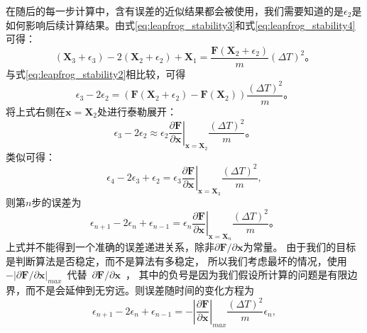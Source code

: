 {在随后的每一步计算中，含有误差的近似结果都会被使用，我们需要知道的是${\epsilon}_2$是如何影响后续计算结果。由式\eqref{eq:leapfrog_stability3}和式\eqref{eq:leapfrog_stability4}可得：
      \begin{equation}
         \label{eq:leapfrog_stabilit6}
         (\mathbf{X}_{3}+{\epsilon}_3)-2(\mathbf{X}_{2}+{\epsilon}_2)+\mathbf{X}_{1} = \frac{\mathbf{F}(\mathbf{X}_2+{\epsilon}_2)}{m} {(\Delta T)^2} \text{。}
      \end{equation}
与式\eqref{eq:leapfrog_stability2}相比较，可得
      \begin{equation}
         \label{eq:leapfrog_stabilit7}
         {\epsilon}_3-2{\epsilon}_2 = \left(\mathbf{F}(\mathbf{X}_2+{\epsilon}_2)  -\mathbf{F}(\mathbf{X}_2) \right)\frac{{(\Delta T)^2}}{m} \text{。}
      \end{equation}
将上式右侧在$\mathbf{x}=\mathbf{X}_2$处进行泰勒展开：
      \begin{equation}
         \label{eq:leapfrog_stabilit8}
         {\epsilon}_3-2{\epsilon}_2 \approx {\epsilon}_2\left. \frac{\partial\mathbf{F}}{\partial\mathbf{x}}\right|_{\mathbf{x}=\mathbf{X}_2} \frac{{(\Delta T)^2}}{m} \text{。}
      \end{equation}
类似可得：
      \begin{equation}
         \label{eq:leapfrog_stabilit9}
         {\epsilon}_4-2{\epsilon}_3+{\epsilon}_2 = {\epsilon}_3\left. \frac{\partial\mathbf{F}}{\partial\mathbf{x}}\right|_{\mathbf{x}=\mathbf{X}_3} \frac{{(\Delta T)^2}}{m},
      \end{equation}
则第$n$步的误差为
      \begin{equation}
         \label{eq:leapfrog_stabilit10}
         {\epsilon}_{n+1}-2{\epsilon}_n+{\epsilon}_{n-1} = {\epsilon}_n \left. \frac{\partial\mathbf{F}}{\partial\mathbf{x}}\right|_{\mathbf{x}=\mathbf{X}_n} \frac{{(\Delta T)^2}}{m} \text{。}
      \end{equation}
上式并不能得到一个准确的误差递进关系，除非${\partial\mathbf{F}}/{\partial\mathbf{x}}$为常量。
由于我们的目标是判断算法是否稳定，而不是算法有多稳定，
所以我们考虑最坏的情况，使用~$-|{\partial\mathbf{F}}/{\partial\mathbf{x}}|_{max}$~代替~${\partial\mathbf{F}}/{\partial\mathbf{x}}$~，
其中的负号是因为我们假设所计算的问题是有限边界，而不是会延伸到无穷远。则误差随时间的变化方程为
      \begin{equation}
        \label{eq:leapfrog_stabilit11}
         {\epsilon}_{n+1}-2{\epsilon}_n+{\epsilon}_{n-1} = -\left| \frac{\partial\mathbf{F}}{\partial\mathbf{x}}\right|_{max} \frac{{(\Delta T)^2}}{m} {\epsilon}_n,

\end{equation}}
